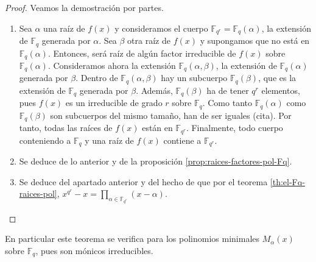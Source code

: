 \begin{proof}
  Veamos la demostración por partes.
  \begin{enumerate}
    \item Sea \(\alpha\) una raíz de \(f(x)\) y consideramos el cuerpo \(\mathbb F_{q^r} = \mathbb F_{q}(\alpha)\), la extensión de \(\mathbb F_q\) generada por \(\alpha\).
    Sea \(\beta\) otra raíz de \(f(x)\) y supongamos que no está en \(\mathbb F_{q}(\alpha)\).
    Entonces, será raíz de algún factor irreducible de \(f(x)\) sobre \(\mathbb F_{q}(\alpha)\).
    Consideramos ahora la extensión \(\mathbb F_{q}(\alpha, \beta)\), la extensión de \(\mathbb F_{q}(\alpha)\) generada por \(\beta\).
    Dentro de \(\mathbb F_{q}(\alpha, \beta)\) hay un subcuerpo \(\mathbb F_{q}(\beta)\), que es la extensión de \(\mathbb F_q\) generada por \(\beta\).
    Además, \(\mathbb F_{q}(\beta)\) ha de tener \(q^r\) elementos, pues \(f(x)\) es un irreducible de grado \(r\) sobre \(\mathbb F_q\).
    Como tanto \(\mathbb F_{q}(\alpha)\) como \(\mathbb F_{q}(\beta)\) son subcuerpos del mismo tamaño, han de ser iguales (cita). %
    Por tanto, todas las raíces de \(f(x)\) están en \(\mathbb F_{q^r}\).
    Finalmente, todo cuerpo conteniendo a \(\mathbb F_q\) y una raíz de \(f(x)\) contiene a \(\mathbb F_{q^r}\).
    \item Se deduce de lo anterior y de la proposición \ref{prop:raices-factores-pol-Fq}.
    \item Se deduce del apartado anterior y del hecho de que por el teorema \ref{th:el-Fq-raices-pol}, \(x^{q^r} - x = \prod_{\alpha \in \mathbb F_{q^r}}(x - \alpha)\).
  \end{enumerate}
\end{proof}

En particular este teorema se verifica para los polinomios minimales \(M_{\alpha}(x)\) sobre \(\mathbb F_q\), pues son mónicos irreducibles.

